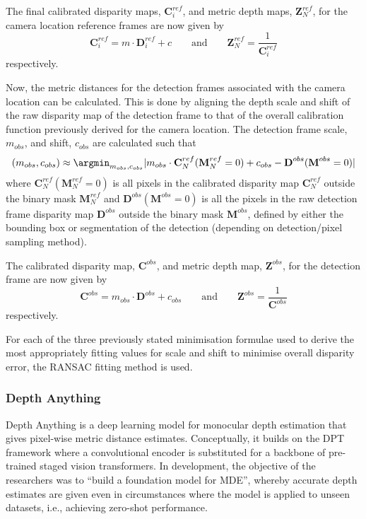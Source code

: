 The final calibrated disparity maps, $\textbf{C}_i^{ref}$, and metric depth maps, $\textbf{Z}_N^{ref}$,
for the camera location reference frames are now given by
\[
    \textbf{C}_i^{ref} = m \cdot \textbf{D}_i^{ref} + c
    \qquad \mathrm{and} \qquad
    \textbf{Z}_N^{ref} = \dfrac{1}{\textbf{C}_i^{ref}}
\]
respectively.

Now, the metric distances for the detection frames associated with the camera location can be
calculated.
This is done by aligning the depth scale and shift of the raw disparity map of the detection frame to
that of the overall calibration function previously derived for the camera location.
The detection frame scale, $m_{obs}$, and shift, $c_{obs}$ are calculated such that
\[
    (m_{obs},c_{obs}) \approx \argmin_{m_{obs},c_{obs}} |m_{obs} \cdot \textbf{C}_N^{ref}(\textbf{M}_N^{ref}=0) + c_{obs} - \textbf{D}^{obs}(\textbf{M}^{obs}=0)|
\]
where $\textbf{C}_N^{ref}(\textbf{M}_N^{ref}=0)$ is all pixels in the calibrated disparity map $\textbf{C}_N^{ref}$
outside the binary mask $\textbf{M}_N^{ref}$ and $\textbf{D}^{obs}(\textbf{M}^{obs}=0)$ is all the pixels in
the raw detection frame disparity map $\textbf{D}^{obs}$ outside the binary mask $\textbf{M}^{obs}$, defined
by either the bounding box or segmentation of the detection (depending on detection/pixel sampling method).

The calibrated disparity map, $\textbf{C}^{obs}$, and metric depth map, $\textbf{Z}^{obs}$,
for the detection frame are now given by
\[
    \textbf{C}^{obs} = m_{obs} \cdot \textbf{D}^{obs} + c_{obs}
    \qquad \mathrm{and} \qquad
    \textbf{Z}^{obs} = \dfrac{1}{\textbf{C}^{obs}}
\]
respectively.

For each of the three previously stated minimisation formulae used to derive the most appropriately
fitting values for scale and shift to minimise overall disparity error, the RANSAC fitting method
is used\cite{HAUCKE2022101536,ransac}.

\subsubsection{Depth Anything}

Depth Anything is a deep learning model for monocular depth estimation that gives pixel-wise
metric distance estimates.
Conceptually, it builds on the DPT framework where a convolutional encoder is substituted for a
backbone of pre-trained staged vision transformers.\cite{dpt,depth_anything}
In development, the objective of the researchers was to ``build a foundation model for
MDE'',\cite{depth_anything} whereby accurate depth estimates are given even in circumstances
where the model is applied to unseen datasets, i.e., achieving zero-shot performance.\cite{zero_shot}

